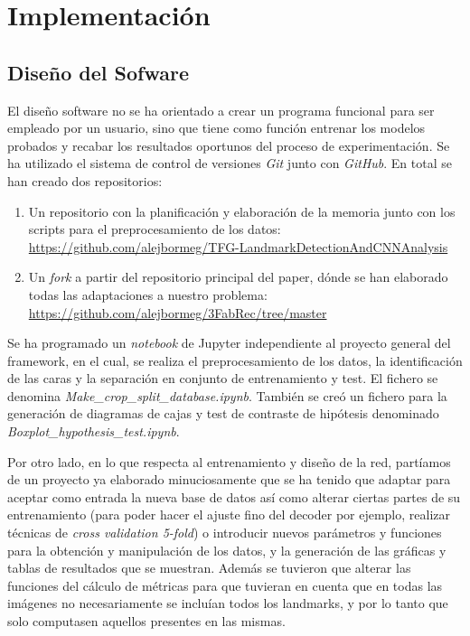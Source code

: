 \chapter{Implementación}

\section{Diseño del Sofware}

\noindent El diseño software no se ha orientado a crear un programa funcional para ser empleado por un usuario, sino que tiene como función entrenar los modelos probados y recabar los resultados oportunos del proceso de experimentación. Se ha utilizado el sistema de control de versiones \textit{Git} junto con \textit{GitHub}. En total se han creado dos repositorios:

\begin{enumerate}
    \item Un repositorio con la planificación y elaboración de la memoria junto con los scripts para el preprocesamiento de los datos: \url{https://github.com/alejbormeg/TFG-LandmarkDetectionAndCNNAnalysis}
    \item Un \textit{fork} a partir del repositorio principal del paper, dónde se han elaborado todas las adaptaciones a nuestro problema: \url{https://github.com/alejbormeg/3FabRec/tree/master}
\end{enumerate}

\medskip

\noindent Se ha programado un \textit{notebook} de Jupyter independiente al proyecto general del framework, en el cual, se realiza el preprocesamiento de los datos, la identificación de las caras y la separación en conjunto de entrenamiento y test. El fichero se denomina \textit{Make\_crop\_split\_database.ipynb}. También se creó un fichero para la generación de diagramas de cajas y test de contraste de hipótesis denominado \textit{Boxplot\_hypothesis\_test.ipynb}.

\medskip

\noindent Por otro lado, en lo que respecta al entrenamiento y diseño de la red, partíamos de un proyecto ya elaborado minuciosamente que se ha tenido que adaptar para aceptar como entrada la nueva base de datos así como alterar ciertas partes de su entrenamiento (para poder hacer el ajuste fino del decoder por ejemplo, realizar técnicas de \textit{cross validation 5-fold}) o introducir nuevos parámetros y funciones para la obtención y manipulación de los datos, y la generación de las gráficas y tablas de resultados que se muestran. Además se tuvieron que alterar las funciones del cálculo de métricas para que tuvieran en cuenta que en todas las imágenes no necesariamente se incluían todos los landmarks, y por lo tanto que solo computasen aquellos presentes en las mismas.

